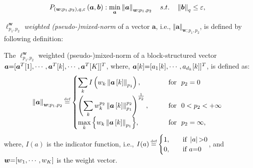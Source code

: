 \begin{Mydefinition}
\leftbar
\begin{equation*}
\label{eq:Opt-Lp1barp2}
P_{\left( \boldsymbol{w};p_1,p_2 \right),q,\varepsilon} \left( \boldsymbol{a},\boldsymbol{b} \right): \min_{\boldsymbol{a}} \left\lVert\boldsymbol{a}\right\rVert_{\boldsymbol{w};p_1,p_2} \quad s.t. \quad \left\lVert\boldsymbol{b}\right\rVert_q \leq \varepsilon,
\end{equation*}
\endleftbar
\end{Mydefinition}
$\ell_{p_1,p_2}^{\boldsymbol{w}}$ \emph{weighted (pseudo-)mixed-norm} of a vector $\boldsymbol{a}$, i.e., $\Vert \boldsymbol{a} \Vert_{\boldsymbol{w};p_1,p_2}$, is defined by following definition:
\begin{Mydefinition}
\label{def:Weighted mixed norm} 
\leftbar
The $\ell_{p_1,p_2}^{\boldsymbol{w}}$ weighted (pseudo-)mixed-norm of a block-structured vector $\boldsymbol{a} {=} [\boldsymbol{a}^T[1], \cdots, \boldsymbol{a}^T[k], \cdots, \boldsymbol{a}^T[K]]^T$, where, $\boldsymbol{a} [k] {=} [a_1[k], \cdots, a_{{d_k}} [k]]^T$, is defined as:
\begin{equation*}
\mynorm{\boldsymbol{a}}_{\boldsymbol{w};p_1,p_2} \myeq 
\begin{cases}
    \mycolor{\displaystyle\sum_{k}^{} I \myparanthese{w_k \mynorm{\boldsymbol{a} \mybracket{k}}_{p_1}},} & \qquad \mycolor{\text{for \ }p_2= 0}\\
    \myparanthese{\displaystyle\sum_{k}^{} w_k^{p_2} \mynorm{\boldsymbol{a} \mybracket{k}}_{p_1}^ {p_2}} ^ {\frac{1}{p_2}},  & \qquad  \text{for \ } 0 < p_2 < +\infty\\
    \displaystyle\max_{k}{\mybrace{w_k \mynorm{\boldsymbol{a} \mybracket{k}}_{p_1}}}, & \qquad \text{for \ } p_2= \infty,
  \end{cases}
\end{equation*}
where, $I(a)$ is the indicator function, i.e., $I(a) \myeq
  \begin{cases}
    1,  & \quad \text{if } \myabs{a} \sg 0\\
    0,  & \quad \text{if } a \seq 0\\
  \end{cases}$, and $\boldsymbol{w} {=} [w_1, \cdots, w_K ]$ is the weight vector. 
\endleftbar
\end{Mydefinition}